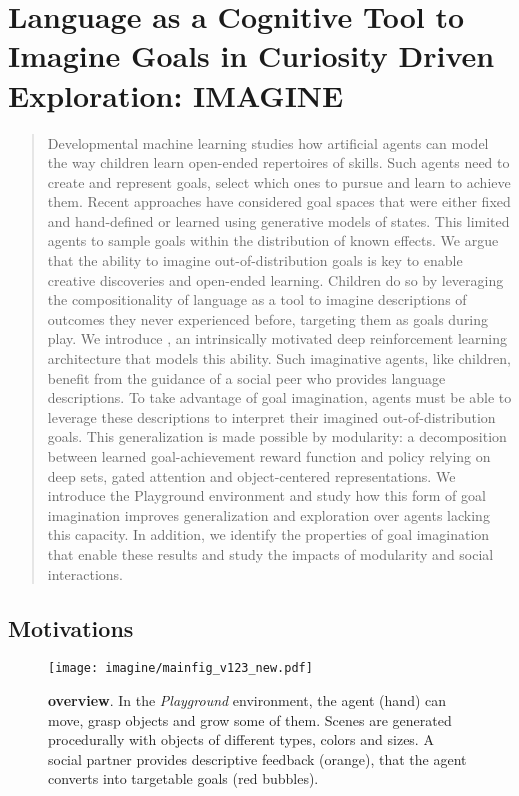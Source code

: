 \chapter{Language as a Cognitive Tool to Imagine Goals in Curiosity Driven Exploration: IMAGINE}
\label{chap:imagine}

\minitoc

\begin{abstract}
Developmental machine learning studies how artificial agents can model the way children learn open-ended repertoires of skills. Such agents need to create and represent goals, select which ones to pursue and learn to achieve them. Recent approaches have considered goal spaces that were either fixed and hand-defined or learned using generative models of states. This limited agents to sample goals within the distribution of known effects. We argue that the ability to imagine out-of-distribution goals is key to enable creative discoveries and open-ended learning. Children do so by leveraging the compositionality of language as a tool to imagine descriptions of outcomes they never experienced before, targeting them as goals during play. We introduce \imagine, an intrinsically motivated deep reinforcement learning architecture that models this ability. Such imaginative agents, like children, benefit from the guidance of a social peer who provides language descriptions. To take advantage of goal imagination, agents must be able to leverage these descriptions to interpret their imagined out-of-distribution goals. This generalization is made possible by modularity: a decomposition between learned goal-achievement reward function and policy relying on deep sets, gated attention and object-centered representations. We introduce the Playground environment and study how this form of goal imagination improves generalization and exploration over agents lacking this capacity. In addition, we identify the properties of goal imagination that enable these results and study the impacts of modularity and social interactions.
\end{abstract}

\section{Motivations}

\begin{figure}[ht!]
  \centering
    \texttt{[image: imagine/mainfig\_v123\_new.pdf]}
  \caption{\textbf{\imagine overview}. In the \textit{Playground} environment, the agent (hand) can move, grasp objects and grow some of them.
  Scenes are generated procedurally with objects of different types, colors and sizes. A social partner provides descriptive feedback (orange), that the agent converts into targetable goals (red bubbles). \label{fig:main}
}
  \vspace{-.5cm}
\end{figure} 


